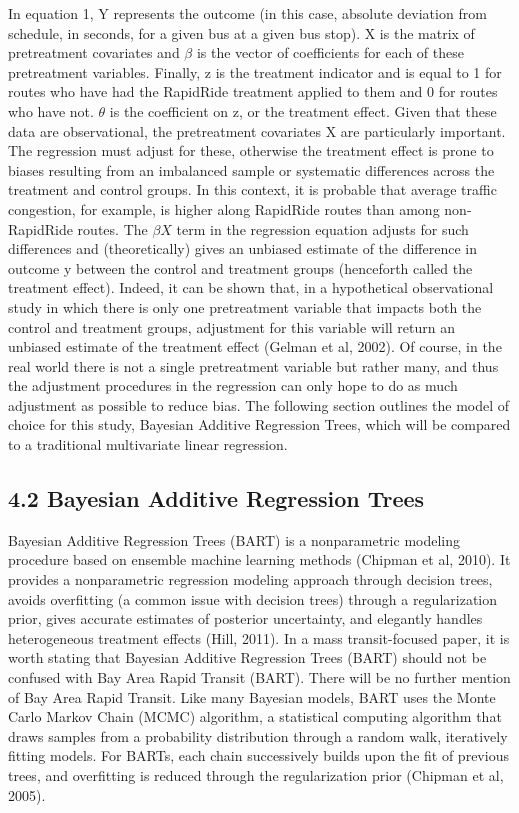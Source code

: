 \documentclass[
  12pt,
]{article}
\begin{document}
In equation 1, Y represents the outcome (in this case, absolute
deviation from schedule, in seconds, for a given bus at a given bus
stop). X is the matrix of pretreatment covariates and \(\beta\) is the
vector of coefficients for each of these pretreatment variables.
Finally, z is the treatment indicator and is equal to 1 for routes who
have had the RapidRide treatment applied to them and 0 for routes who
have not. \(\theta\) is the coefficient on z, or the treatment effect.
Given that these data are observational, the pretreatment covariates X
are particularly important. The regression must adjust for these,
otherwise the treatment effect is prone to biases resulting from an
imbalanced sample or systematic differences across the treatment and
control groups. In this context, it is probable that average traffic
congestion, for example, is higher along RapidRide routes than among
non-RapidRide routes. The \(\beta X\) term in the regression equation
adjusts for such differences and (theoretically) gives an unbiased
estimate of the difference in outcome y between the control and
treatment groups (henceforth called the treatment effect). Indeed, it
can be shown that, in a hypothetical observational study in which there
is only one pretreatment variable that impacts both the control and
treatment groups, adjustment for this variable will return an unbiased
estimate of the treatment effect (Gelman et al, 2002). Of course, in the
real world there is not a single pretreatment variable but rather many,
and thus the adjustment procedures in the regression can only hope to do
as much adjustment as possible to reduce bias. The following section
outlines the model of choice for this study, Bayesian Additive
Regression Trees, which will be compared to a traditional multivariate
linear regression.

\subsection{4.2 Bayesian Additive Regression
Trees}\label{bayesian-additive-regression-trees}

Bayesian Additive Regression Trees (BART) is a nonparametric modeling
procedure based on ensemble machine learning methods (Chipman et al,
2010). It provides a nonparametric regression modeling approach through
decision trees, avoids overfitting (a common issue with decision trees)
through a regularization prior, gives accurate estimates of posterior
uncertainty, and elegantly handles heterogeneous treatment effects
(Hill, 2011). In a mass transit-focused paper, it is worth stating that
Bayesian Additive Regression Trees (BART) should not be confused with
Bay Area Rapid Transit (BART). There will be no further mention of Bay
Area Rapid Transit. Like many Bayesian models, BART uses the Monte Carlo
Markov Chain (MCMC) algorithm, a statistical computing algorithm that
draws samples from a probability distribution through a random walk,
iteratively fitting models. For BARTs, each chain successively builds
upon the fit of previous trees, and overfitting is reduced through the
regularization prior (Chipman et al, 2005).
\end{document}
